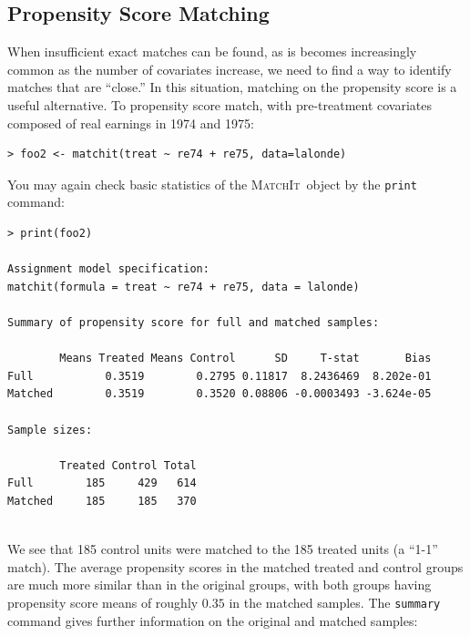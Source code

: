 \documentclass[oneside,letterpaper,titlepage]{article}
\newcommand{\MatchIt}{\textsc{MatchIt}}
\begin{document}
 
 



\subsection{Propensity Score Matching}
When insufficient exact matches can be found, as is becomes
increasingly common as the number of covariates increase, we need to
find a way to identify matches that are ``close.''  In this situation,
matching on the propensity score is a useful alternative.  To
propensity score match, with pre-treatment covariates composed of real
earnings in 1974 and 1975:

\begin{verbatim}
> foo2 <- matchit(treat ~ re74 + re75, data=lalonde)
\end{verbatim} 

\noindent You may again check basic statistics of the \MatchIt\ object by the
\texttt{print} command:

\begin{verbatim}
> print(foo2)
 
Assignment model specification:
matchit(formula = treat ~ re74 + re75, data = lalonde)
 
Summary of propensity score for full and matched samples:
 
        Means Treated Means Control      SD     T-stat       Bias
Full           0.3519        0.2795 0.11817  8.2436469  8.202e-01
Matched        0.3519        0.3520 0.08806 -0.0003493 -3.624e-05
 
Sample sizes:
 
        Treated Control Total
Full        185     429   614
Matched     185     185   370
 
\end{verbatim} 
We see that 185 control units were matched to the 185 treated units (a
``1-1'' match).  The average propensity scores in the matched treated
and control groups are much more similar than in the original groups,
with both groups having propensity score means of roughly $0.35$ in
the matched samples.  The {\tt summary} command gives further
information on the original and matched samples:
\end{document}
